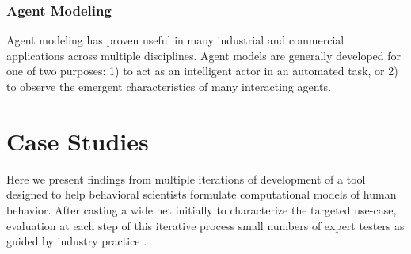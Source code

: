 \documentclass[conference]{IEEEtran}
\begin{document}
\subsubsection{Agent Modeling}
Agent modeling has proven useful in many industrial and commercial applications across multiple disciplines. \cite{metzger2011survey, macal2011introductory}
Agent models are generally developed for one of two purposes: 1) to act as an intelligent actor in an automated task, or 2) to observe the emergent characteristics of many interacting agents. 

\section{Case Studies}
Here we present findings from multiple iterations of development of a tool designed to help behavioral scientists formulate computational models of human behavior.
After casting a wide net initially to characterize the targeted use-case, evaluation at each step of this iterative process small numbers of expert testers as guided by industry practice \cite{nielsen2000}.

% 
% 
   
\end{document}
